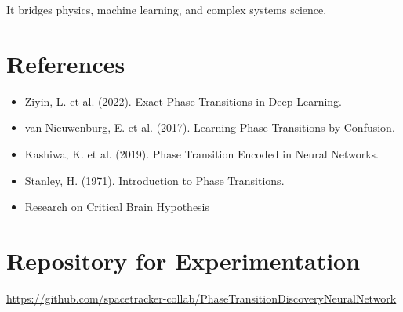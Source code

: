 \documentclass[12pt]{article}
\begin{document}
It bridges physics, machine learning, and complex systems science.

\section{References}

\begin{itemize}
\item Ziyin, L. et al. (2022). Exact Phase Transitions in Deep Learning.
\item van Nieuwenburg, E. et al. (2017). Learning Phase Transitions by Confusion.
\item Kashiwa, K. et al. (2019). Phase Transition Encoded in Neural Networks.
\item Stanley, H. (1971). Introduction to Phase Transitions.
\item Research on Critical Brain Hypothesis
\end{itemize}

\section{Repository for Experimentation}

\noindent
\url{https://github.com/spacetracker-collab/PhaseTransitionDiscoveryNeuralNetwork}
\end{document}

